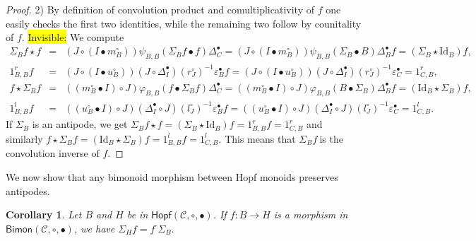\documentclass[nosumlimits,twoside]{amsart}
\newtheorem{corollary}[corollary]{\sc Corollary}
\theoremstyle{definition}
\theoremstyle{remark}
\def\revsn{\text{-}}
\newenvironment{invisible}{{\noindent\sc \colorbox{yellow}{Invisible:}\;}\color{gray}}{\medskip}
\newcommand{\Cc}{\mathcal{C}}
\begin{document}
\begin{proof}
2)  By definition of convolution product and comultiplicativity of $f$ one easily checks the first two identities, while the remaining two follow by counitality of $f$.
\begin{invisible}
We compute
\begin{eqnarray*}
\Sigma _{B}f\star f &=&\left( J\circ \left( I\bullet m_{B}^{\circ }\right)
\right) \psi _{B,B}\left( \Sigma _{B}f\bullet f\right) \Delta _{C}^{\bullet
}=\left( J\circ \left( I\bullet m_{B}^{\circ }\right) \right) \psi
_{B,B}\left( \Sigma _{B}\bullet B\right) \Delta _{B}^{\bullet }f=\left(
\Sigma _{B}\star \mathrm{Id}_{B}\right) f, \\
1_{B,B}^{r}f &=&\left( J\circ \left( I\bullet u_{B}^{\circ }\right) \right)
\left( J\circ \Delta _{I}^{\bullet }\right) \left( r_{J}^{\circ }\right)
^{-1}\varepsilon _{B}^{\bullet }f=\left( J\circ \left( I\bullet u_{B}^{\circ
}\right) \right) \left( J\circ \Delta _{I}^{\bullet }\right) \left(
r_{J}^{\circ }\right) ^{-1}\varepsilon _{C}^{\bullet }=1_{C,B}^{r},\\
f\star \Sigma _{B}f &=&\left( \left( m_{B}^{\circ }\bullet I\right) \circ
J\right) \varphi _{B,B}\left( f\bullet \Sigma _{B}f\right) \Delta
_{C}^{\bullet }=\left( \left( m_{B}^{\circ }\bullet I\right) \circ J\right)
\varphi _{B,B}\left( B\bullet \Sigma _{B}\right) \Delta _{B}^{\bullet
}f=\left( \mathrm{Id}_{B}\star \Sigma _{B}\right) f, \\
1_{B,B}^{l}f &=&\left( \left( u_{B}^{\circ }\bullet I\right) \circ J\right)
\left( \Delta _{I}^{\bullet }\circ J\right) \left( l_{J}^{\circ }\right)
^{-1}\varepsilon _{B}^{\bullet }f=\left( \left( u_{B}^{\circ }\bullet
I\right) \circ J\right) \left( \Delta _{I}^{\bullet }\circ J\right) \left(
l_{J}^{\circ }\right) ^{-1}\varepsilon _{C}^{\bullet }=1_{C,B}^{l}.
\end{eqnarray*}%
\end{invisible}
If $\Sigma _{B}$ is an antipode, we get $\Sigma _{B}f\star f=\left( \Sigma
_{B}\star \mathrm{Id}_{B}\right) f=1_{B,B}^{r}f=1_{C,B}^{r}$ and similarly $f\star
\Sigma _{B}f=\left( \mathrm{Id}_{B}\star \Sigma _{B}\right)
f=1_{B,B}^{l}f=1_{C,B}^{l}.$ This means that $\Sigma _{B}f\ $is the
convolution inverse of $f.$
\end{proof}

We now show that any bimonoid morphism between Hopf monoids preserves antipodes.

\begin{corollary}
\label{coro:convcomp}
 Let $B$ and $H$ be in $\mathsf{Hopf}(\Cc,\circ,\bullet)$. If $f:B\rightarrow H$ is a morphism in $\mathsf{Bimon}(\Cc,\circ,\bullet)$, we have $\Sigma _{H}f=f^{\revsn }\Sigma _{B}.$    
\end{corollary}
\end{document}
